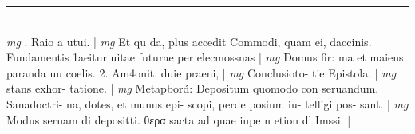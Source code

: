 \documentclass{article}
\begin{document}
\begin{pages}
\vspace{0.5cm}\noindent
\vspace{0.2cm}\rule{1cm}{0.2pt}\\ 
\hspace{0.2cm}\textit{mg}
\footnotesize . Raio a utui. 
\normalsize| 
\hspace{0.2cm}\textit{mg}
\footnotesize Et qu da, plus accedit Commodi, quam ei, daccinis. Fundamentis 1aeitur uitae futurae per elecmossnas 
\normalsize| 
\hspace{0.2cm}\textit{mg}
\footnotesize Domus fir: ma et maiens paranda uu coelis. 2. Am4onit. duie praeni, 
\normalsize| 
\hspace{0.2cm}\textit{mg}
\footnotesize Conclusioto- tie Epistola. 
\normalsize| 
\hspace{0.2cm}\textit{mg}
\footnotesize  stans exhor- tatione. 
\normalsize| 
\hspace{0.2cm}\textit{mg}
\footnotesize Metapbord́: Depositum quomodo con seruandum. Sanadoctri- na, dotes, et munus epi- scopi, perde posium iu- telligi pos- sant. 
\normalsize| 
\hspace{0.2cm}\textit{mg}
\footnotesize Modus seruam di depositti. θερα sacta ad quae iupe n etion dl Imssi. 
\normalsize| 

\end{pages}
\end{document}

